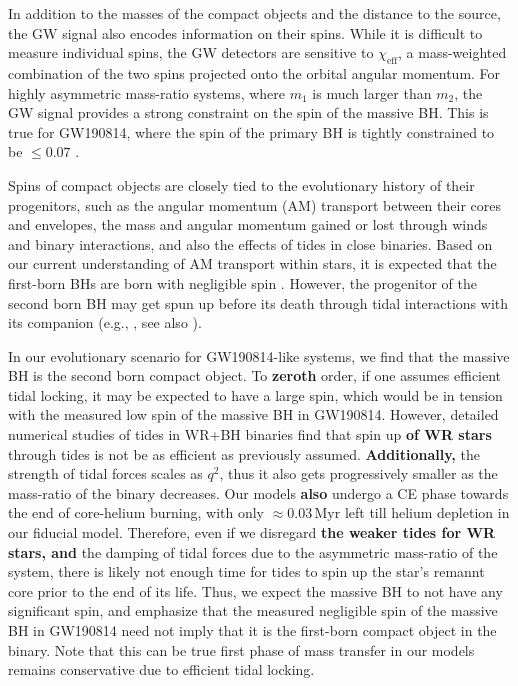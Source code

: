 \documentclass[linenumbers,trackchanges,twocolumn]{aastex701}
\begin{document}
In addition to the masses of the compact objects and the distance to
the source, the GW signal also encodes information on their spins. While it is difficult to measure individual spins,
the GW detectors are sensitive to $\chi_{\mathrm{eff}}$, a mass-weighted combination of the two spins projected onto the orbital angular momentum. For highly asymmetric mass-ratio systems, where $m_1$ is much larger than $m_2$, the GW signal provides a strong constraint on the spin of the massive BH. This is true for GW190814, where the spin of the primary BH is tightly constrained to be $\leq 0.07$ \citep{2020ApJ...896L..44A}.

Spins of compact objects are closely tied to the evolutionary history of their progenitors, such as the angular momentum (AM) transport between their cores and envelopes, the mass and angular momentum gained or lost through winds and binary interactions, and also the effects of tides in close binaries. Based on our current understanding of AM transport within stars, it is expected that the first-born BHs are born with negligible spin \citep[e.g.,][]{2019ApJ...881L...1F}. However, the progenitor of the second born BH may get spun up before its death through tidal interactions with its companion (e.g., \citealp{2020A&A...635A..97B}, see also \citealp{2025A&A...696A..54S}).

In our evolutionary scenario for GW190814-like systems, we find that the massive BH is the second born compact object. To \textbf{zeroth} order, if one assumes efficient tidal locking, it may be expected to have a large spin, which would be in tension with the measured low spin of the massive BH in GW190814. However, detailed numerical studies of tides in WR+BH binaries \citep{2023ApJ...952...53M} find that spin up \textbf{of WR stars} through tides is not be as efficient as previously assumed. \textbf{Additionally,} the strength of tidal forces scales as $q^2$, thus it also gets progressively smaller as the mass-ratio of the binary decreases. Our models \textbf{also} undergo a CE phase towards the end of core-helium burning, with only $\approx 0.03\,\mathrm{Myr}$ left till helium depletion in our fiducial model. Therefore, even if we disregard \textbf{the weaker tides for WR stars, and }the damping of tidal forces due to the asymmetric mass-ratio of the system, there is likely not enough time for tides to spin up the star's remannt core prior to the end of its life. Thus, we expect the massive BH to not have any significant spin, and emphasize that the measured negligible spin of the massive BH in GW190814 need not imply that it is the first-born compact object in the binary. Note that this can be true first phase of mass transfer in our models remains conservative due to efficient tidal locking.  
\end{document}
